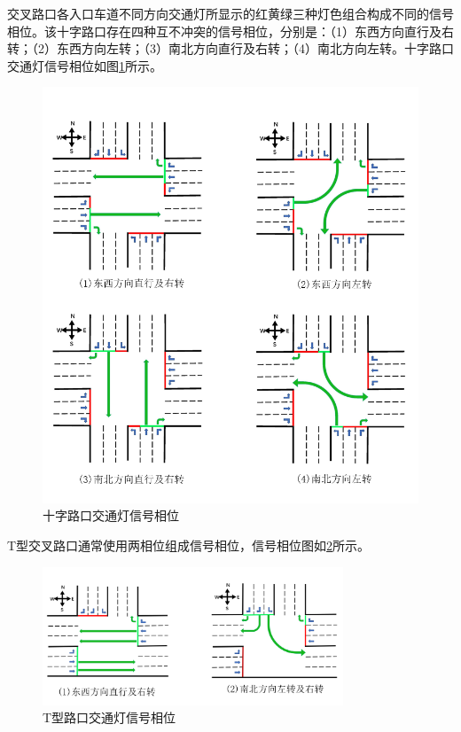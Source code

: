 交叉路口各入口车道不同方向交通灯所显示的红黄绿三种灯色组合构成不同的信号相位。该十字路口存在四种互不冲突的信号相位，分别是：（1）东西方向直行及右转；（2）东西方向左转；（3）南北方向直行及右转；（4）南北方向左转。十字路口交通灯信号相位如图\ref{fig:intersection_phase}所示。
\begin{figure}[H]
	\centering
	\includegraphics[width=\textwidth]{figures/intersection_phase.png}
	\caption{十字路口交通灯信号相位}
	\label{fig:intersection_phase}
\end{figure}


T型交叉路口通常使用两相位组成信号相位，信号相位图如\ref{fig:T_intersection_phase}所示。


\begin{figure}[H]
	\centering
	\includegraphics[width=0.8\textwidth]{figures/T_intersection_phase.png}
	\caption{T型路口交通灯信号相位}
	\label{fig:T_intersection_phase}
\end{figure}

